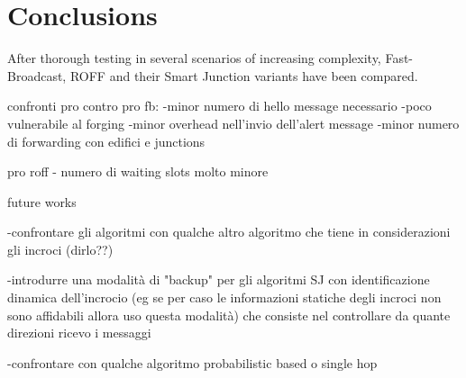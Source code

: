

\chapter{Conclusions}
	After thorough testing in several scenarios of increasing complexity, Fast-Broadcast, ROFF and their Smart Junction variants have been compared. 










confronti pro contro
pro fb:
-minor numero di hello message necessario
-poco vulnerabile al forging
-minor overhead nell'invio dell'alert message
-minor numero di forwarding con edifici e junctions


pro roff
- numero di waiting slots molto minore





future works

-confrontare gli algoritmi con qualche altro algoritmo che tiene in considerazioni gli incroci (dirlo??)

-introdurre una modalità di "backup" per gli algoritmi SJ con identificazione dinamica dell'incrocio (eg se per caso le informazioni statiche degli incroci non sono affidabili allora uso questa modalità) che consiste nel controllare da quante direzioni ricevo i messaggi

-confrontare con qualche algoritmo probabilistic based o single hop

